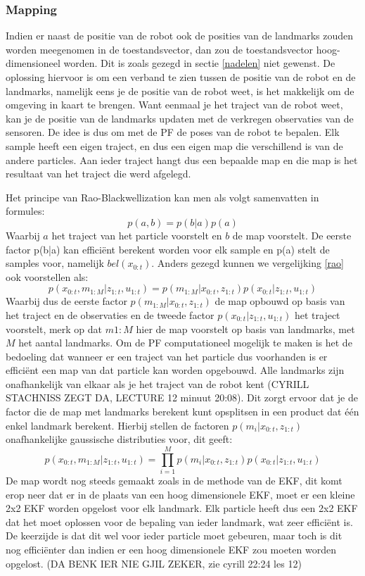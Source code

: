 \documentclass{book}
\begin{document}
\subsubsection{Mapping}
Indien er naast de positie van de robot ook de posities van de landmarks zouden worden meegenomen in de toestandsvector, dan zou de toestandsvector hoog-dimensioneel worden. Dit is zoals gezegd in sectie \ref{nadelen} niet gewenst.
De oplossing hiervoor is om een verband te zien tussen de positie van de robot en de landmarks, namelijk eens je de positie van de robot weet, is het makkelijk om de omgeving in kaart te brengen. Want eenmaal je het traject van de robot weet, kan je de positie van de landmarks updaten met de verkregen observaties van de sensoren.
De idee is dus om met de PF de poses van de robot te bepalen. Elk sample heeft een eigen traject, en dus een eigen map die verschillend is van de andere particles. Aan ieder traject hangt dus een bepaalde map en die map is het resultaat van het traject die werd afgelegd.

Het principe van Rao-Blackwellization kan men als volgt samenvatten in formules:
\begin{equation}
p(a,b) = p(b|a) p(a)
\label{rao}
\end{equation}
Waarbij $a$ het traject van het particle voorstelt en $b$ de map voorstelt. De eerste factor p(b|a) kan efficiënt berekent worden voor elk sample en p(a) stelt de samples voor, namelijk $bel(x_{0:t})$. Anders gezegd kunnen we vergelijking \ref{rao} ook voorstellen als:
\begin{equation}
p(x_{0:t},m_{1:M}|z_{1:t},u_{1:t})= p(m_{1:M}|x_{0:t},z_{1:t})p(x_{0:t}|z_{1:t},u_{1:t}) 
\end{equation}
Waarbij dus de eerste factor $p(m_{1:M}|x_{0:t},z_{1:t})$ de map opbouwd op basis van het traject en de observaties en de tweede factor $p(x_{0:t}|z_{1:t},u_{1:t})$ het traject voorstelt, merk op dat $m{1:M}$ hier de map voorstelt op basis van landmarks, met $M$ het aantal landmarks.
Om de PF computationeel mogelijk te maken is het de bedoeling dat wanneer er een traject van het particle dus voorhanden is er efficiënt een map van dat particle kan worden opgebouwd. Alle landmarks zijn onafhankelijk van elkaar als je het traject van de robot kent (CYRILL STACHNISS ZEGT DA, LECTURE 12 minuut 20:08). Dit zorgt ervoor dat je de factor die de map met landmarks berekent kunt opsplitsen in een product dat één enkel landmark berekent. Hierbij stellen de factoren $p(m_{i}|x_{0:t},z_{1:t})$ onafhankelijke gaussische distributies voor, dit geeft:
\begin{equation}
p(x_{0:t},m_{1:M}|z_{1:t},u_{1:t})= \prod_{i=1}^Mp(m_{i}|x_{0:t},z_{1:t})p(x_{0:t}|z_{1:t},u_{1:t}) 
\end{equation}
De map wordt nog steeds gemaakt zoals in de methode van de EKF, dit komt erop neer dat er in de plaats van een hoog dimensionele EKF, moet er een kleine 2x2 EKF worden opgelost voor elk landmark. Elk particle heeft dus een 2x2 EKF dat het moet oplossen voor de bepaling van ieder landmark, wat zeer efficiënt is. De keerzijde is dat dit wel voor ieder particle moet gebeuren, maar toch is dit nog efficiënter dan indien er een hoog dimensionele EKF zou moeten worden opgelost. (DA BENK IER NIE GJIL ZEKER, zie cyrill 22:24 les 12) 
\end{document}
